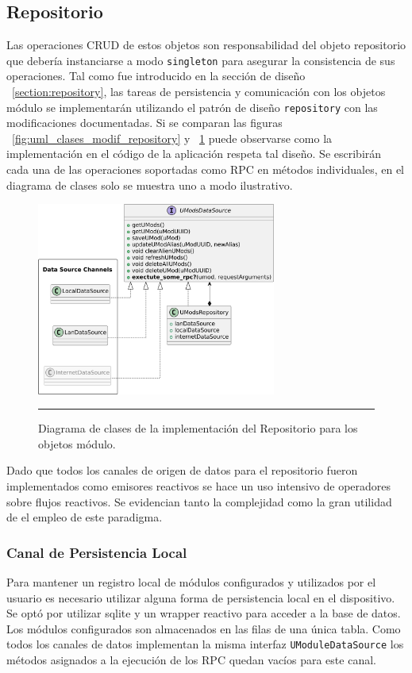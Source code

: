\subsection{Repositorio}
Las operaciones CRUD de estos objetos son responsabilidad del objeto repositorio que debería instanciarse a modo \texttt{singleton} para asegurar la consistencia de sus operaciones. Tal como fue introducido en la sección de diseño ~\ref{section:repository}, las tareas de persistencia y comunicación con los objetos módulo se implementarán utilizando el patrón de diseño \texttt{repository} con las modificaciones documentadas. Si se comparan las figuras ~\ref{fig:uml_clases_modif_repository} y ~\ref{fig:class_umods_repository} puede observarse como la implementación en el código de la aplicación respeta tal diseño. Se escribirán cada una de las operaciones soportadas como RPC en métodos individuales, en el diagrama de clases solo se muestra uno a modo ilustrativo.

\begin{figure}[htbp]
	\centering
	\includegraphics[width=0.7\textwidth]{Figures/iter1/CLASS_umods_repository_ink.png}
	\rule{35em}{1pt}
	\caption[Clases Repositorio Módulos]{Diagrama de clases de la implementación del Repositorio para los objetos módulo.}
	\label{fig:class_umods_repository}
\end{figure}

Dado que todos los canales de origen de datos para el repositorio fueron implementados como emisores reactivos se hace un uso intensivo de operadores sobre flujos reactivos. Se evidencian tanto la complejidad como la gran utilidad de el empleo de este paradigma.

\subsubsection{Canal de Persistencia Local}
Para mantener un registro local de módulos configurados y utilizados por el usuario es necesario utilizar alguna forma de persistencia local en el dispositivo. Se optó por utilizar sqlite y un wrapper reactivo para acceder a la base de datos. Los módulos configurados son almacenados en las filas de una única tabla. Como todos los canales de datos implementan la misma interfaz \texttt{UModuleDataSource} los métodos asignados a la ejecución de los RPC quedan vacíos para este canal. 

